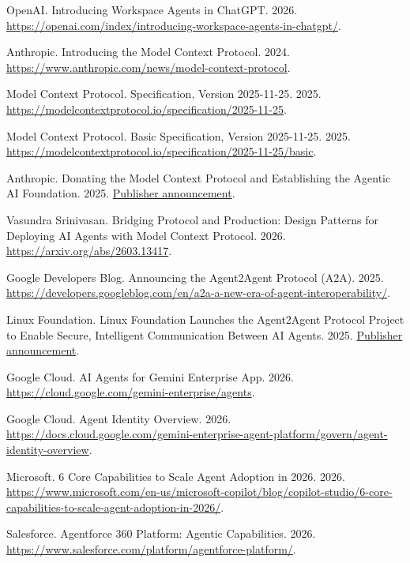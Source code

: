  {OpenAI}. Introducing Workspace Agents in {ChatGPT}. 2026. \url{https://openai.com/index/introducing-workspace-agents-in-chatgpt/}.

 {Anthropic}. Introducing the Model Context Protocol. 2024. \url{https://www.anthropic.com/news/model-context-protocol}.

 {Model Context Protocol}. Specification, Version 2025-11-25. 2025. \url{https://modelcontextprotocol.io/specification/2025-11-25}.

 {Model Context Protocol}. Basic Specification, Version 2025-11-25. 2025. \url{https://modelcontextprotocol.io/specification/2025-11-25/basic}.

 {Anthropic}. Donating the Model Context Protocol and Establishing the Agentic AI Foundation. 2025. \href{https://www.anthropic.com/news/donating-the-model-context-protocol-and-establishing-of-the-agentic-ai-foundation}{Publisher announcement}.

 Vasundra Srinivasan. Bridging Protocol and Production: Design Patterns for Deploying {AI} Agents with Model Context Protocol. 2026. \url{https://arxiv.org/abs/2603.13417}.

 {Google Developers Blog}. Announcing the Agent2Agent Protocol ({A2A}). 2025. \url{https://developers.googleblog.com/en/a2a-a-new-era-of-agent-interoperability/}.

 {Linux Foundation}. Linux Foundation Launches the Agent2Agent Protocol Project to Enable Secure, Intelligent Communication Between {AI} Agents. 2025. \href{https://www.linuxfoundation.org/press/linux-foundation-launches-the-agent2agent-protocol-project-to-enable-secure-intelligent-communication-between-ai-agents}{Publisher announcement}.

 {Google Cloud}. {AI} Agents for {Gemini Enterprise} App. 2026. \url{https://cloud.google.com/gemini-enterprise/agents}.

 {Google Cloud}. Agent Identity Overview. 2026. \url{https://docs.cloud.google.com/gemini-enterprise-agent-platform/govern/agent-identity-overview}.

 {Microsoft}. 6 Core Capabilities to Scale Agent Adoption in 2026. 2026. \url{https://www.microsoft.com/en-us/microsoft-copilot/blog/copilot-studio/6-core-capabilities-to-scale-agent-adoption-in-2026/}.

 {Salesforce}. {Agentforce 360 Platform}: Agentic Capabilities. 2026. \url{https://www.salesforce.com/platform/agentforce-platform/}.


